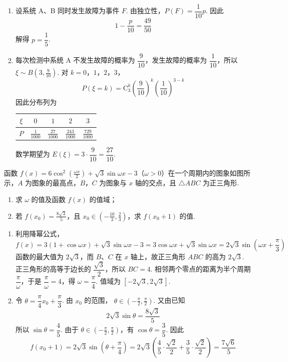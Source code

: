 \begin{solution}
\begin{enumerate}
\item 设系统 A、B 同时发生故障为事件 \(F\). 由独立性，\(P(F)=\dfrac1{10}p\). 因此
\[
1-\frac{p}{10}=\frac{49}{50}
\]
解得 \(p=\dfrac15\).
\item 每次检测中系统 A 不发生故障的概率为 \(\dfrac9{10}\)，发生故障的概率为 \(\dfrac1{10}\)，所以 \(\xi\sim B(3,\frac9{10})\). 对 \(k=0\)，\(1\)，\(2\)，\(3\)，
\[
P(\xi=k)=\mathrm C_3^k\left(\frac9{10}\right)^k\left(\frac1{10}\right)^{3-k}
\]
因此分布列为
\begin{center}
\begin{tabular}{c|cccc}
\(\xi\)&\(0\)&\(1\)&\(2\)&\(3\)\\ \hline
\(P\)&\(\frac1{1000}\)&\(\frac{27}{1000}\)&\(\frac{243}{1000}\)&\(\frac{729}{1000}\)
\end{tabular}
\end{center}
数学期望为 \(E(\xi)=3\cdot\dfrac9{10}=\dfrac{27}{10}\).
\end{enumerate}
\end{solution}

\begin{problem}
函数 \(f(x)=6\cos^2\left(\frac{\omega x}{2}\right)+\sqrt{3}\sin\omega x-3\)（\(\omega>0\)）在一个周期内的图象如图所示，\(A\) 为图象的最高点，\(B\)，\(C\) 为图象与 \(x\) 轴的交点，且 \(\triangle ABC\) 为正三角形.
\begin{enumerate}
\item 求 \( \omega \) 的值及函数 \( f(x) \) 的值域；
\item 若 \( f(x_0) = \frac{8\sqrt{3}}{5} \)，且 \( x_0 \in \left(-\frac{10}{3}, \frac{2}{3}\right) \)，求 \( f(x_0 + 1) \) 的值.
\end{enumerate}

\end{problem}

\begin{solution}
\begin{enumerate}
\item 利用降幂公式，
\[
f(x)=3(1+\cos\omega x)+\sqrt3\sin\omega x-3
 =3\cos\omega x+\sqrt3\sin\omega x
 =2\sqrt3\sin\left(\omega x+\frac\pi3\right)
\]
函数的最大值为 \(2\sqrt3\)，而 \(B\)、\(C\) 在 \(x\) 轴上，故正三角形 \(ABC\) 的高为 \(2\sqrt3\). 正三角形的高等于边长的 \(\dfrac{\sqrt3}{2}\)，所以 \(BC=4\). 相邻两个零点的距离为半个周期 \(\dfrac\pi\omega\)，于是 \(\dfrac\pi\omega=4\)，得 \(\omega=\dfrac\pi4\). 值域为 \([-2\sqrt3,2\sqrt3]\).
\item 令 \(\theta=\dfrac\pi4x_0+\dfrac\pi3\). 由 \(x_0\) 的范围，
\(\theta\in(-\frac\pi2,\frac\pi2)\). 又由已知
\[
2\sqrt3\sin\theta=\frac{8\sqrt3}{5}
\]
所以 \(\sin\theta=\dfrac45\). 由于 \(\theta\in(-\frac\pi2,\frac\pi2)\)，有 \(\cos\theta=\dfrac35\). 因此
\[
f(x_0+1)=2\sqrt3\sin\left(\theta+\frac\pi4\right)
 =2\sqrt3\left(\frac45\cdot\frac{\sqrt2}{2}+\frac35\cdot\frac{\sqrt2}{2}\right)
 =\frac{7\sqrt6}{5}
\]
\end{enumerate}
\end{solution}

